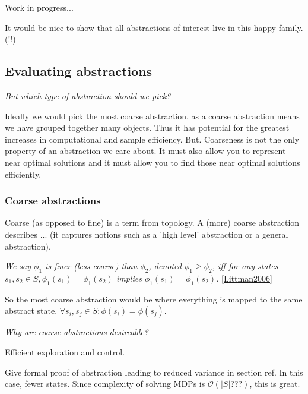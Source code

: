{\color{red}Work in progress...}

It would be nice to show that all abstractions of interest live in this happy family. (!!)


\subsection{Evaluating abstractions}

\begin{displayquote}
\textit{But which type of abstraction should we pick?}
\end{displayquote}

Ideally we would pick the most coarse abstraction, as a coarse abstraction means we have grouped together many objects.
Thus it has potential for the greatest increases in computational and sample efficiency.
But. Coarseness is not the only property of an abstraction we care about.
It must also allow you to represent near optimal solutions and it must allow you to find those near optimal solutions efficiently.


\subsubsection{Coarse abstractions}

Coarse (as opposed to fine) is a term from topology.
A (more) coarse abstraction describes
... (it captures notions such as a 'high level' abstraction or a general abstraction).

\textit{We say $\phi_1$ is finer (less coarse) than $\phi_2$, denoted $\phi_1 \ge \phi_2$,
iff for any states $s_1, s_2 \in S, \phi_1(s_1) = \phi_1(s_2)$ implies $\phi_1(s_1) = \phi_1(s_2)$.} \ref{Littman2006}\footnotemark[8]


So the most coarse abstraction would be where everything is mapped to the same abstract state.
$\forall s_i, s_j\in S: \phi(s_i)=\phi(s_j)$.

\begin{displayquote}
\textit{Why are coarse abstractions desireable?}
\end{displayquote}

Efficient exploration and control.

Give formal proof of abstraction leading to reduced variance in section ref.
In this case, fewer states. Since complexity of solving MDPs is $\mathcal O(|S| ???)$, this is great.

